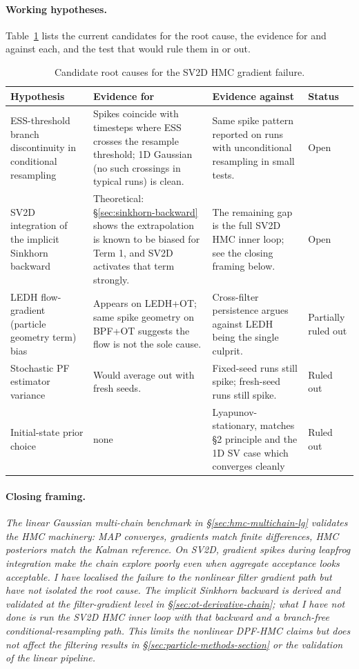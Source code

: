\documentclass{article}
\begin{document}
\paragraph{Working hypotheses.} Table~\ref{tab:sv2d-hypotheses} lists the current candidates for the root cause, the evidence for and against each, and the test that would rule them in or out.

\begin{table}[H]
\centering
\footnotesize
\caption{Candidate root causes for the SV2D HMC gradient failure.}
\label{tab:sv2d-hypotheses}
\begin{tabular}{p{3.4cm}p{3.8cm}p{3.8cm}p{2.2cm}}
\toprule
Hypothesis & Evidence for & Evidence against & Status \\
\midrule
ESS-threshold branch discontinuity in conditional resampling & Spikes coincide with timesteps where ESS crosses the resample threshold; 1D Gaussian (no such crossings in typical runs) is clean. & Same spike pattern reported on runs with unconditional resampling in small tests. & Open \\
SV2D integration of the implicit Sinkhorn backward & Theoretical: §\ref{sec:sinkhorn-backward} shows the extrapolation is known to be biased for Term 1, and SV2D activates that term strongly. & The remaining gap is the full SV2D HMC inner loop; see the closing framing below. & Open \\
LEDH flow-gradient (particle geometry term) bias & Appears on LEDH+OT; same spike geometry on BPF+OT suggests the flow is not the sole cause. & Cross-filter persistence argues against LEDH being the single culprit. & Partially ruled out \\
Stochastic PF estimator variance & Would average out with fresh seeds. & Fixed-seed runs still spike; fresh-seed runs still spike. & Ruled out \\
Initial-state prior choice & none & Lyapunov-stationary, matches §2 principle and the 1D SV case which converges cleanly & Ruled out \\
\bottomrule
\end{tabular}
\end{table}

\paragraph{Closing framing.}
\emph{The linear Gaussian multi-chain benchmark in \S\ref{sec:hmc-multichain-lg} validates the HMC machinery: MAP converges, gradients match finite differences, HMC posteriors match the Kalman reference. On SV2D, gradient spikes during leapfrog integration make the chain explore poorly even when aggregate acceptance looks acceptable. I have localised the failure to the nonlinear filter gradient path but have not isolated the root cause. The implicit Sinkhorn backward is derived and validated at the filter-gradient level in \S\ref{sec:ot-derivative-chain}; what I have not done is run the SV2D HMC inner loop with that backward and a branch-free conditional-resampling path. This limits the nonlinear DPF-HMC claims but does not affect the filtering results in \S\ref{sec:particle-methods-section} or the validation of the linear pipeline.}
\fi
\end{document}
